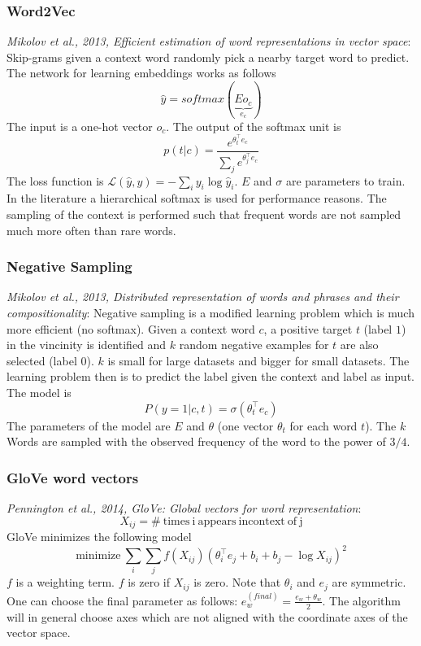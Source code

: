 \documentclass{article}
\begin{document}
\subsubsection{Word2Vec}
\emph{Mikolov et al., 2013, Efficient estimation of word representations in vector space}:
Skip-grams given a context word randomly pick a nearby target word to predict.
The network for learning embeddings works as follows
\begin{equation}
  \hat{y}=softmax(\underbrace{Eo_c}_{e_c})
\end{equation}
The input is a one-hot vector $o_c$.
The output of the softmax unit is
\begin{equation}
  p(t|c)=\frac{e^{\theta_t^\top e_c}}{\sum_je^{\theta_j^\top e_c}}
\end{equation}
The loss function is $\mathcal{L}(\hat{y},y)=-\sum_iy_i\log\hat{y}_i$.
$E$ and $\sigma$ are parameters to train.
In the literature a hierarchical softmax is used for performance reasons.
The sampling of the context is performed such that frequent words are not sampled much more often than rare words.

\subsubsection{Negative Sampling}
\emph{Mikolov et al., 2013, Distributed representation of words and phrases and their compositionality}:
Negative sampling is a modified learning problem which is much more efficient (no softmax).
Given a context word $c$, a positive target $t$ (label $1$) in the vincinity is identified
and $k$ random negative examples for $t$ are also selected (label $0$).
$k$ is small for large datasets and bigger for small datasets.
The learning problem then is to predict the label given the context and label as input.
The model is
\begin{equation}
  P(y=1|c,t)=\sigma(\theta_t^\top e_c)
\end{equation}
The parameters of the model are $E$ and $\theta$ (one vector $\theta_t$ for each word $t$).
The $k$ Words are sampled with the observed frequency of the word to the power of $3/4$.

\subsubsection{GloVe word vectors}
\emph{Pennington et al., 2014, GloVe: Global vectors for word representation}:
\begin{equation}
  X_{ij}=\mathrm{\#\ times\ i\ appears\ in context\ of\ j}
\end{equation}
GloVe minimizes the following model
\begin{equation}
  \mathrm{minimize\ }\sum_i\sum_jf(X_{ij})(\theta_i^\top e_j + b_i + b_j - \log X_{ij})^2
\end{equation}
$f$ is a weighting term. $f$ is zero if $X_{ij}$ is zero.
Note that $\theta_i$ and $e_j$ are symmetric.
One can choose the final parameter as follows: $e_w^{(final)}=\frac{e_w+\theta_w}{2}$.
The algorithm will in general choose axes which are not aligned with the coordinate axes of the vector space.
\end{document}
